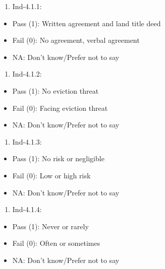 \documentclass[
]{report}
\providecommand{\tightlist}{%
  \setlength{\itemsep}{0pt}\setlength{\parskip}{0pt}}
\begin{document}
\begin{enumerate}
\def\labelenumi{\arabic{enumi}.}
\tightlist
\item
  Ind-4.1.1:
\end{enumerate}

\begin{itemize}
\tightlist
\item
  Pass (1): Written agreement and land title deed
\item
  Fail (0): No agreement, verbal agreement
\item
  NA: Don't know/Prefer not to say
\end{itemize}

\begin{enumerate}
\def\labelenumi{\arabic{enumi}.}
\setcounter{enumi}{1}
\tightlist
\item
  Ind-4.1.2:
\end{enumerate}

\begin{itemize}
\tightlist
\item
  Pass (1): No eviction threat
\item
  Fail (0): Facing eviction threat
\item
  NA: Don't know/Prefer not to say
\end{itemize}

\begin{enumerate}
\def\labelenumi{\arabic{enumi}.}
\setcounter{enumi}{2}
\tightlist
\item
  Ind-4.1.3:
\end{enumerate}

\begin{itemize}
\tightlist
\item
  Pass (1): No risk or negligible
\item
  Fail (0): Low or high risk
\item
  NA: Don't know/Prefer not to say
\end{itemize}

\begin{enumerate}
\def\labelenumi{\arabic{enumi}.}
\setcounter{enumi}{3}
\tightlist
\item
  Ind-4.1.4:
\end{enumerate}

\begin{itemize}
\tightlist
\item
  Pass (1): Never or rarely
\item
  Fail (0): Often or sometimes
\item
  NA: Don't know/Prefer not to say
\end{itemize}
\end{document}
